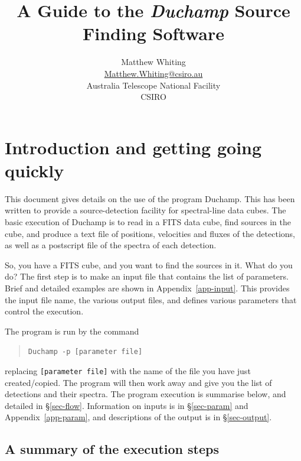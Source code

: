 \documentclass[12pt]{article}
\title{A Guide to the {\it Duchamp} Source Finding Software}
\author{Matthew Whiting\\{\small \href{mailto:Matthew.Whiting@csiro.au}{Matthew.Whiting@csiro.au}}\\
Australia Telescope National Facility\\CSIRO}
\date{}
\begin{document}
\maketitle
\tableofcontents

\newpage
\section{Introduction and getting going quickly}

This document gives details on the use of the program Duchamp. This
has been written to provide a source-detection facility for
spectral-line data cubes. The basic execution of Duchamp is to read
in a FITS data cube, find sources in the cube, and produce a text
file of positions, velocities and fluxes of the detections, as well as
a postscript file of the spectra of each detection. 

So, you have a FITS cube, and you want to find the sources in it. What
do you do? The first step is to make an input file that contains the
list of parameters. Brief and detailed examples are shown in
Appendix~\ref{app-input}. This provides the input file name, the various
output files, and defines various parameters that control the
execution.

The program is run by the command
\begin{quote}
{\tt Duchamp -p [parameter file]}
\end{quote}
replacing {\tt [parameter file]} with the name of the file you have
just created/copied. The program will then work away and give you the
list of detections and their spectra. The program execution is
summarise below, and detailed in \S\ref{sec-flow}. Information on
inputs is in \S\ref{sec-param} and Appendix~\ref{app-param}, and
descriptions of the output is in \S\ref{sec-output}.

\subsection{A summary of the execution steps}
\end{document}
